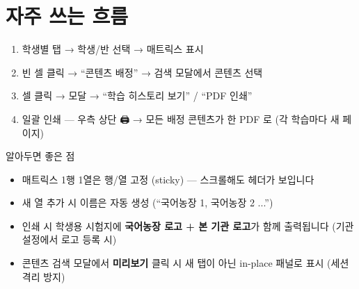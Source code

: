 \section*{자주 쓰는 흐름}
\begin{enumerate}
  \item 학생별 탭 → 학생/반 선택 → 매트릭스 표시
  \item 빈 셀 클릭 → ``콘텐츠 배정'' → 검색 모달에서 콘텐츠 선택
  \item 셀 클릭 → 모달 → ``학습 히스토리 보기'' / ``PDF 인쇄''
  \item 일괄 인쇄 — 우측 상단 🖨 → 모든 배정 콘텐츠가 한 PDF 로 (각 학습마다 새 페이지)
\end{enumerate}

\begin{tipbox}{알아두면 좋은 점}
\begin{itemize}[leftmargin=1.2em]
  \item 매트릭스 1행 1열은 행/열 고정 (sticky) — 스크롤해도 헤더가 보입니다
  \item 새 열 추가 시 이름은 자동 생성 (``국어농장 1, 국어농장 2 ...'')
  \item 인쇄 시 학생용 시험지에 \textbf{국어농장 로고 + 본 기관 로고}가 함께 출력됩니다 (기관 설정에서 로고 등록 시)
  \item 콘텐츠 검색 모달에서 \textbf{미리보기} 클릭 시 새 탭이 아닌 in-place 패널로 표시 (세션 격리 방지)
\end{itemize}
\end{tipbox}
